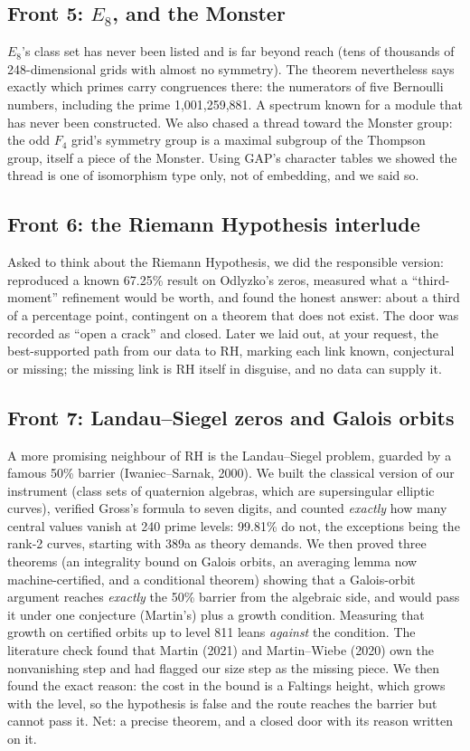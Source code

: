 \documentclass[11pt]{article}
\begin{document}
\subsection{Front 5: $E_8$, and the Monster}
$E_8$'s class set has never been listed and is far beyond reach (tens of thousands of 248-dimensional grids with almost no symmetry). The theorem nevertheless says exactly which primes carry congruences there: the numerators of five Bernoulli numbers, including the prime 1,001,259,881. A spectrum known for a module that has never been constructed. We also chased a thread toward the Monster group: the odd $F_4$ grid's symmetry group is a maximal subgroup of the Thompson group, itself a piece of the Monster. Using GAP's character tables we showed the thread is one of isomorphism type only, not of embedding, and we said so.

\subsection{Front 6: the Riemann Hypothesis interlude}
Asked to think about the Riemann Hypothesis, we did the responsible version: reproduced a known 67.25\% result on Odlyzko's zeros, measured what a ``third-moment'' refinement would be worth, and found the honest answer: about a third of a percentage point, contingent on a theorem that does not exist. The door was recorded as ``open a crack'' and closed. Later we laid out, at your request, the best-supported path from our data to RH, marking each link known, conjectural or missing; the missing link is RH itself in disguise, and no data can supply it.

\subsection{Front 7: Landau--Siegel zeros and Galois orbits}
A more promising neighbour of RH is the Landau--Siegel problem, guarded by a famous 50\% barrier (Iwaniec--Sarnak, 2000). We built the classical version of our instrument (class sets of quaternion algebras, which are supersingular elliptic curves), verified Gross's formula to seven digits, and counted \emph{exactly} how many central values vanish at 240 prime levels: 99.81\% do not, the exceptions being the rank-2 curves, starting with 389a as theory demands. We then proved three theorems (an integrality bound on Galois orbits, an averaging lemma now machine-certified, and a conditional theorem) showing that a Galois-orbit argument reaches \emph{exactly} the 50\% barrier from the algebraic side, and would pass it under one conjecture (Martin's) plus a growth condition. Measuring that growth on certified orbits up to level 811 leans \emph{against} the condition. The literature check found that Martin (2021) and Martin--Wiebe (2020) own the nonvanishing step and had flagged our size step as the missing piece. We then found the exact reason: the cost in the bound is a Faltings height, which grows with the level, so the hypothesis is false and the route reaches the barrier but cannot pass it. Net: a precise theorem, and a closed door with its reason written on it.
\end{document}
